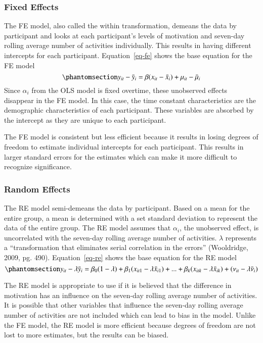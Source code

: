 \documentclass[
  letterpaper,
  number,
  review,
  3p]{elsarticle}
\begin{document}
\subsubsection{Fixed Effects}\label{fixed-effects}

The FE model, also called the within transformation, demeans the data by
participant and looks at each participant's levels of motivation and
seven-day rolling average number of activities individually. This
results in having different intercepts for each participant.
Equation~\ref{eq-fe} shows the base equation for the FE model
\begin{equation}\phantomsection\label{eq-fe}{
y_{it} - \bar{y}_i = \beta ( x_{it} - \bar{x}_i ) + \mu_{it} -\bar{\mu}_i 
}\end{equation} Since \(\alpha_i\) from the OLS model is fixed overtime,
these unobserved effects disappear in the FE model. In this case, the
time constant characteristics are the demographic characteristics of
each participant. These variables are absorbed by the intercept as they
are unique to each participant.

The FE model is consistent but less efficient because it results in
losing degrees of freedom to estimate individual intercepts for each
participant. This results in larger standard errors for the estimates
which can make it more difficult to recognize significance.

\subsubsection{Random Effects}\label{random-effects}

The RE model semi-demeans the data by participant. Based on a mean for
the entire group, a mean is determined with a set standard deviation to
represent the data of the entire group. The RE model assumes that
\(\alpha_i\), the unobserved effect, is uncorrelated with the seven-day
rolling average number of activities. \(\lambda\) represents a
``transformation that eliminates serial correlation in the errors''
(Wooldridge, 2009, pg. 490). Equation~\ref{eq-re} shows the base
equation for the RE model \begin{equation}\phantomsection\label{eq-re}{ 
y_{it}-\lambda\bar{y}_i = \beta_0(1-\lambda)+\beta_1 ( x_{it1}-\lambda\bar{x}_{i1})+...+\beta_k (x_{itk}-\lambda\bar{x}_{ik})+(\nu_{it}-\lambda\bar{\nu}_i) 
}\end{equation}

\hfill\break
The RE model is appropriate to use if it is believed that the difference
in motivation has an influence on the seven-day rolling average number
of activities. It is possible that other variables that influence the
seven-day rolling average number of activities are not included which
can lead to bias in the model. Unlike the FE model, the RE model is more
efficient because degrees of freedom are not lost to more estimates, but
the results can be biased.
\end{document}
